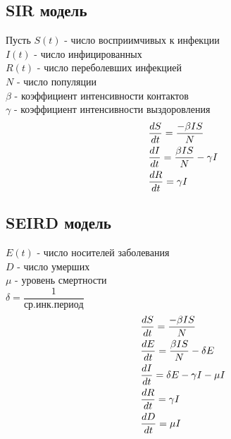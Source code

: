 \subsection{SIR модель}
Пусть $S(t)$ - число восприимчивых к инфекции\\
$I(t)$ - число инфицированных\\
$R(t)$ - число переболевших инфекцией\\
$N$ - число популяции\\
$\beta$ - коэффициент интенсивности контактов \\
$\gamma$ - коэффициент интенсивности выздоровления
\begin{align}
  &\dfrac{d S}{dt}=\dfrac{-\beta IS}{N}\notag\\
  &\dfrac{d I}{dt}=\dfrac{\beta IS}{N}-\gamma I\\
  &\dfrac{d R}{dt}=\gamma I\notag
\end{align}

\subsection{SEIRD модель}
$E(t)$ - число носителей заболевания\\
$D$ - число умерших\\
$\mu$ - уровень смертности\\
$\delta=\dfrac{1}{\text{ср.инк.период}}$
\begin{align}
  &\dfrac{d S}{dt}=\dfrac{-\beta IS}{N}\notag\\
  &\dfrac{d E}{dt}=\dfrac{\beta IS}{N}-\delta E\notag\\
  &\dfrac{d I}{dt}=\delta E-\gamma I-\mu I\\
  &\dfrac{d R}{dt}=\gamma I\notag\\
  &\dfrac{d D}{dt}=\mu I\notag
\end{align}

